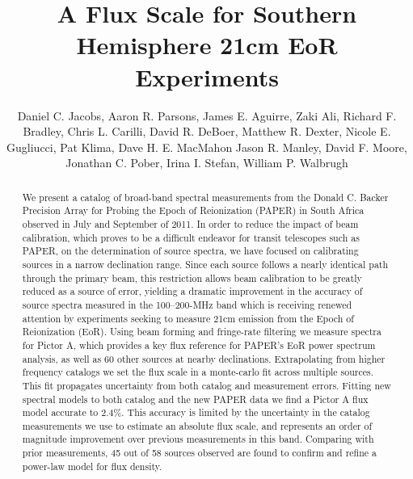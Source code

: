 \documentclass[preprint]{aastex}
\begin{document}
\title{A Flux Scale for Southern Hemisphere 21cm EoR Experiments}
\author{
Daniel C. Jacobs,
Aaron R. Parsons,
James E. Aguirre,
Zaki Ali,
Richard F. Bradley,
Chris L.  Carilli,
David R. DeBoer,
Matthew R. Dexter,
Nicole E. Gugliucci,
Pat Klima,
Dave H. E. MacMahon
Jason R. Manley,
David F. Moore,
Jonathan C. Pober,
Irina I. Stefan,
William P. Walbrugh}


\begin{abstract}
We present a catalog of broad-band spectral measurements from the 
Donald C. Backer Precision Array for Probing
the Epoch of Reionization (PAPER) in South Africa observed in July and
September of 2011.  In order to reduce the impact of beam calibration, which proves to
be a difficult endeavor for transit telescopes such as PAPER, on the determination
of source spectra, we have focused on calibrating sources in a narrow declination range.
Since each source follows a nearly identical path through the primary beam, this
restriction allows beam calibration to be greatly reduced as a source of error,
yielding a dramatic improvement in the accuracy of source spectra measured in the 
100--200-MHz band which is receiving renewed attention by experiments seeking to
measure 21cm emission from the Epoch of Reionization (EoR). Using beam forming
and fringe-rate filtering we measure spectra for Pictor A, which provides a key flux reference for PAPER's EoR
power spectrum analysis, 
as well as 60 other sources at nearby declinations. Extrapolating from higher frequency
catalogs we set the flux scale in a monte-carlo fit across multiple sources. This fit 
propagates uncertainty from both catalog and measurement errors. Fitting new spectral 
models to both catalog and the new PAPER data we find a Pictor A flux model accurate to
2.4\%.
This accuracy is limited by the uncertainty in the catalog measurements we use
to estimate an absolute flux scale, and represents 
an order of magnitude improvement over previous measurements in this band.  
Comparing with prior measurements, 45 out
of 58 sources observed are found to confirm and refine a power-law model for flux density.

\end{abstract}
\end{document}
